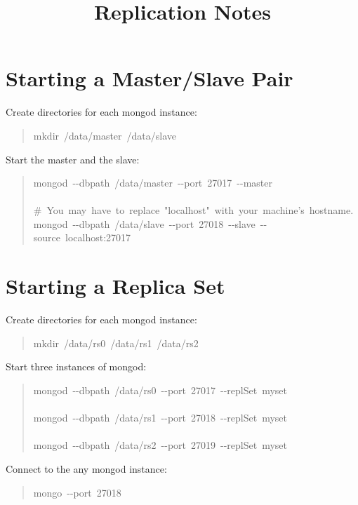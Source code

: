 \documentclass[letter]{article}
\title{\phantomsection%
  Replication Notes%
  \label{replication-notes}}
\author{}
\date{}
\begin{document}
\maketitle


\section{Starting a Master/Slave Pair%
  \label{starting-a-master-slave-pair}%
}

Create directories for each mongod instance:
%
\begin{quote}{\ttfamily \raggedright \noindent
mkdir~/data/master~/data/slave
}
\end{quote}

Start the master and the slave:
%
\begin{quote}{\ttfamily \raggedright \noindent
mongod~-{}-dbpath~/data/master~-{}-port~27017~-{}-master\\
~\\
\#~You~may~have~to~replace~"localhost"~with~your~machine's~hostname.\\
mongod~-{}-dbpath~/data/slave~-{}-port~27018~-{}-slave~-{}-source~localhost:27017
}
\end{quote}


\section{Starting a Replica Set%
  \label{starting-a-replica-set}%
}

Create directories for each mongod instance:
%
\begin{quote}{\ttfamily \raggedright \noindent
mkdir~/data/rs0~/data/rs1~/data/rs2
}
\end{quote}

Start three instances of mongod:
%
\begin{quote}{\ttfamily \raggedright \noindent
mongod~-{}-dbpath~/data/rs0~-{}-port~27017~-{}-replSet~myset\\
~\\
mongod~-{}-dbpath~/data/rs1~-{}-port~27018~-{}-replSet~myset\\
~\\
mongod~-{}-dbpath~/data/rs2~-{}-port~27019~-{}-replSet~myset
}
\end{quote}

Connect to the any mongod instance:
%
\begin{quote}{\ttfamily \raggedright \noindent
mongo~-{}-port~27018
}
\end{quote}
\end{document}
